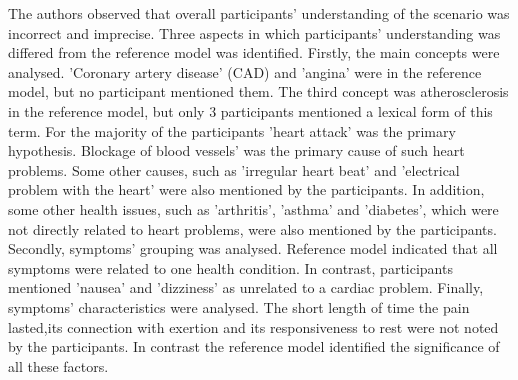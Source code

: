 \documentclass[]{article}
\begin{document}
The authors observed that overall participants’ understanding of the scenario was incorrect and imprecise. Three aspects in which participants' understanding was differed from the reference model was identified. Firstly, the main concepts were analysed. 'Coronary artery disease' (CAD) and 'angina' were in the reference model, but no participant mentioned them. The third concept was atherosclerosis in the reference model, but only 3 participants mentioned a lexical form of this term. For the majority of the participants 'heart attack' was the primary hypothesis. Blockage of blood vessels’ was the primary cause of such heart problems. Some other causes, such as 'irregular heart beat' and 'electrical problem with the heart' were also mentioned by the participants. In addition, some other health issues, such as 'arthritis', 'asthma' and 'diabetes', which were not directly related to heart problems, were also mentioned by the participants. Secondly, symptoms’ grouping was analysed. Reference model indicated that all symptoms were related to one health condition. In contrast, participants mentioned 'nausea' and 'dizziness' as unrelated to a cardiac problem. Finally, symptoms’ characteristics were analysed. The short length of time the pain lasted,its connection with exertion and its responsiveness to rest were not noted by the participants. In contrast the reference model identified the significance of all these factors. 
\end{document}
